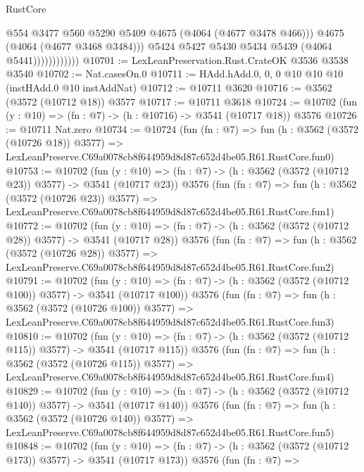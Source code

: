 \begin{lexlean}{RustCore}
\begin{coremodule}
                              @554
                              @3477
                              @560
                              @5290
                              @5409
                              @4675
                              (@4064 (@4677 @3478 @466)))
                            @4675
                            (@4064 (@4677 @3468 @3484)))
                          @5424
                          @5427
                          @5430
                          @5434
                          @5439
                          (@4064 @5441))))))))))))
@10701 := LexLeanPreservation.Rust.CrateOK @3536 @3538 @3540
@10702 := Nat.casesOn.{0}
@10711 := HAdd.hAdd.{0, 0, 0} @10 @10 @10 (instHAdd.{0} @10 instAddNat)
@10712 := @10711 @3620
@10716 := @3562 (@3572 (@10712 @18)) @3577
@10717 := @10711 @3618
@10724 := @10702 (fun (y : @10) => (fn : @7) -> (h : @10716) -> @3541 (@10717 @18)) @3576
@10726 := @10711 Nat.zero
@10734 := @10724
    (fun (fn : @7) =>
    fun (h : @3562 (@3572 (@10726 @18)) @3577) =>
    LexLeanPreserve.C69a0078cb8f644959d8d87c652d4be05.R61.RustCore.fun0)
@10753 := @10702
    (fun (y : @10) => (fn : @7) -> (h : @3562 (@3572 (@10712 @23)) @3577) -> @3541 (@10717 @23))
    @3576
    (fun (fn : @7) =>
    fun (h : @3562 (@3572 (@10726 @23)) @3577) =>
    LexLeanPreserve.C69a0078cb8f644959d8d87c652d4be05.R61.RustCore.fun1)
@10772 := @10702
    (fun (y : @10) => (fn : @7) -> (h : @3562 (@3572 (@10712 @28)) @3577) -> @3541 (@10717 @28))
    @3576
    (fun (fn : @7) =>
    fun (h : @3562 (@3572 (@10726 @28)) @3577) =>
    LexLeanPreserve.C69a0078cb8f644959d8d87c652d4be05.R61.RustCore.fun2)
@10791 := @10702
    (fun (y : @10) => (fn : @7) -> (h : @3562 (@3572 (@10712 @100)) @3577) -> @3541 (@10717 @100))
    @3576
    (fun (fn : @7) =>
    fun (h : @3562 (@3572 (@10726 @100)) @3577) =>
    LexLeanPreserve.C69a0078cb8f644959d8d87c652d4be05.R61.RustCore.fun3)
@10810 := @10702
    (fun (y : @10) => (fn : @7) -> (h : @3562 (@3572 (@10712 @115)) @3577) -> @3541 (@10717 @115))
    @3576
    (fun (fn : @7) =>
    fun (h : @3562 (@3572 (@10726 @115)) @3577) =>
    LexLeanPreserve.C69a0078cb8f644959d8d87c652d4be05.R61.RustCore.fun4)
@10829 := @10702
    (fun (y : @10) => (fn : @7) -> (h : @3562 (@3572 (@10712 @140)) @3577) -> @3541 (@10717 @140))
    @3576
    (fun (fn : @7) =>
    fun (h : @3562 (@3572 (@10726 @140)) @3577) =>
    LexLeanPreserve.C69a0078cb8f644959d8d87c652d4be05.R61.RustCore.fun5)
@10848 := @10702
    (fun (y : @10) => (fn : @7) -> (h : @3562 (@3572 (@10712 @173)) @3577) -> @3541 (@10717 @173))
    @3576
    (fun (fn : @7) =>

\end{coremodule}
\end{lexlean}
